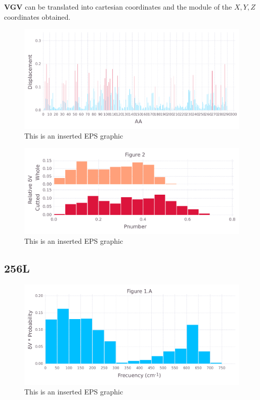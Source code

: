 \documentclass[10pt,letterpaper]{article}
\begin{document}
\FloatBarrier


\textbf{VGV} can be translated into cartesian coordinates and the module of the \(X, Y, Z\) coordinates obtained.

\begin{figure}[ht]
\begin{center}
\includegraphics[scale=0.5]{1prn/5figure.pdf}
\caption{This is an inserted EPS graphic}
\label{fig13}
\end{center}
\end{figure}

\begin{figure}[ht]
\begin{center}
\includegraphics[scale=0.5]{1prn/3both_figure.pdf}
\caption{This is an inserted EPS graphic}
\label{fig13}
\end{center}
\end{figure}

\FloatBarrier
\newpage

\subsection{256L}

\begin{figure}[ht]
\begin{center}
\includegraphics[scale=0.5]{256l/1afigure.pdf}
\caption{This is an inserted EPS graphic}
\label{fig1}
\end{center}
\end{figure}
\end{document}
